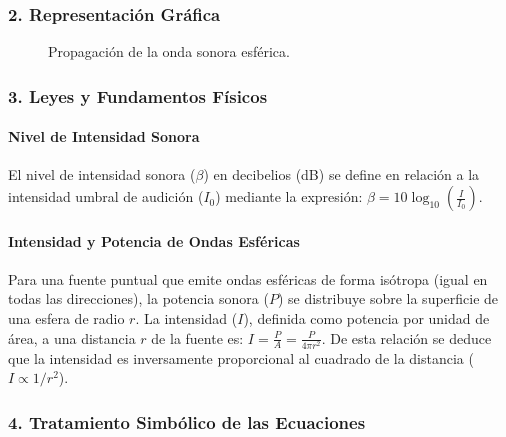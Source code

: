 \subsubsection*{2. Representación Gráfica}
\begin{figure}[H]
    \centering
    \caption{Propagación de la onda sonora esférica.}
\end{figure}

\subsubsection*{3. Leyes y Fundamentos Físicos}
\paragraph*{Nivel de Intensidad Sonora}
El nivel de intensidad sonora ($\beta$) en decibelios (dB) se define en relación a la intensidad umbral de audición ($I_0$) mediante la expresión: $\beta = 10 \log_{10} \left( \frac{I}{I_0} \right)$.
\paragraph*{Intensidad y Potencia de Ondas Esféricas}
Para una fuente puntual que emite ondas esféricas de forma isótropa (igual en todas las direcciones), la potencia sonora ($P$) se distribuye sobre la superficie de una esfera de radio $r$. La intensidad ($I$), definida como potencia por unidad de área, a una distancia $r$ de la fuente es: $I = \frac{P}{A} = \frac{P}{4\pi r^2}$. De esta relación se deduce que la intensidad es inversamente proporcional al cuadrado de la distancia ($I \propto 1/r^2$).

\subsubsection*{4. Tratamiento Simbólico de las Ecuaciones}
